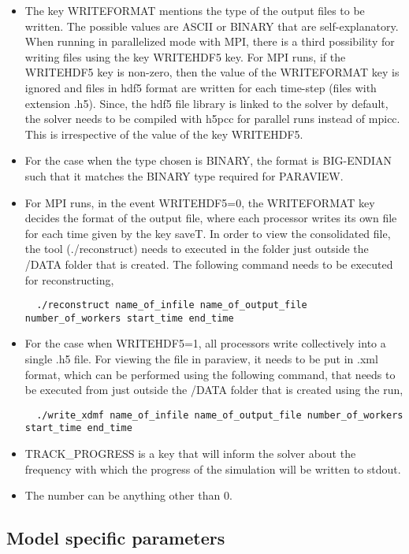 \documentclass[a4paper,10pt]{article}
\begin{document}
\begin{itemize}
 \item The key WRITEFORMAT mentions the type of the output files to be written. 
 The possible values are ASCII or BINARY that are self-explanatory. When running in parallelized mode with MPI, 
 there is a third possibility for writing files using the key WRITEHDF5 key. For MPI runs, if the WRITEHDF5 key 
 is non-zero, then the value of the WRITEFORMAT key is ignored and files in hdf5 format are written for each time-step
 (files with extension .h5). Since, the hdf5 file library is linked to the solver by default, the solver needs 
 to be compiled with h5pcc for parallel runs instead of mpicc. This is irrespective of the value of the key WRITEHDF5.
 \item For the case when the type chosen is BINARY, the format is BIG-ENDIAN such that it matches the BINARY 
 type required for PARAVIEW.
 \item For MPI runs, in the event WRITEHDF5=0, the WRITEFORMAT key decides the format of the output file, where 
 each processor writes its own file for each time given by the key saveT. In order to view the consolidated file, 
 the tool (./reconstruct) needs to executed in the folder just outside the /DATA folder that is created. The following 
 command needs to be executed for reconstructing,
 \begin{lstlisting}
  ./reconstruct name_of_infile name_of_output_file number_of_workers start_time end_time 
 \end{lstlisting}
 \item For the case when WRITEHDF5=1, all processors write collectively into a single .h5 file. For viewing the file in 
 paraview, it needs to be put in .xml format, which can be performed using the following command, that needs to be
 executed from just outside the /DATA folder that is created using the run,
 \begin{lstlisting}
  ./write_xdmf name_of_infile name_of_output_file number_of_workers start_time end_time
 \end{lstlisting}
 \item TRACK\_PROGRESS is a key that will inform the solver about the frequency with which the progress of the simulation will be written to stdout.
 \item The number can be anything other than 0.
\end{itemize}

\subsection{Model specific parameters}
\end{document}

